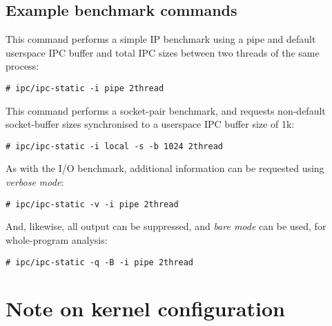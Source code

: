 \documentclass[a4paper,10pt]{article}
\begin{document}
\subsection*{Example benchmark commands}

%
%

This command performs a simple IP benchmark using a pipe and default
userspace IPC buffer and total IPC sizes between two threads of the same
process:

\begin{verbatim}
# ipc/ipc-static -i pipe 2thread
\end{verbatim}

%

\noindent
This command performs a socket-pair benchmark, and requests non-default
socket-buffer sizes synchronised to a userspace IPC buffer size of 1k:

\begin{verbatim}
# ipc/ipc-static -i local -s -b 1024 2thread
\end{verbatim}

\noindent
As with the I/O benchmark, additional information can be requested using
\textit{verbose mode}:

\begin{verbatim}
# ipc/ipc-static -v -i pipe 2thread
\end{verbatim}

\noindent
And, likewise, all output can be suppressed, and \textit{bare mode} can be
used, for whole-program analysis:

\begin{verbatim}
# ipc/ipc-static -q -B -i pipe 2thread
\end{verbatim}

\section*{Note on kernel configuration}
\end{document}
